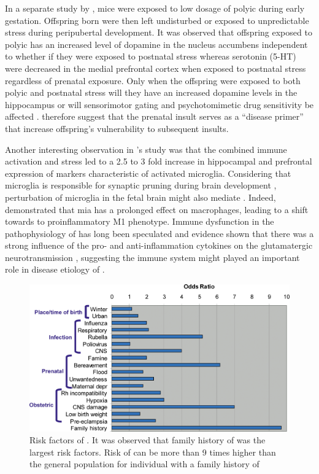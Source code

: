 	In a separate study by \citet{Giovanoli2013}, mice were exposed to low dosage of \gls{polyic} during early gestation.
	Offspring born were then left undisturbed or exposed to unpredictable stress during peripubertal development.
	It was observed that offspring exposed to \gls{polyic} has an increased level of dopamine in the nucleus accumbens independent to whether if they were exposed to postnatal stress whereas serotonin (5-HT) were decreased in the medial prefrontal cortex when exposed to postnatal stress regardless of prenatal exposure.
	Only when the offspring were exposed to both \gls{polyic} and postnatal stress will they have an increased dopamine levels in the hippocampus or will sensorimotor gating and psychotomimetic drug sensitivity be affected \citep{Giovanoli2013}.
	\citet{Giovanoli2013} therefore suggest that the prenatal insult serves as a ``disease primer'' that increase offspring's vulnerability to subsequent insults.
	
	Another interesting observation in \citet{Giovanoli2013}'s study was that the combined immune activation and stress led to a 2.5 to 3 fold increase in hippocampal and prefrontal expression of markers characteristic of activated microglia.
	Considering that microglia is responsible for synaptic pruning during brain development \citep{Paolicelli2011}, perturbation of microglia in the fetal brain might also mediate .
	Indeed, \citet{Onore2014} demonstrated that \gls{mia} has a prolonged effect on macrophages, leading to a shift towards to proinflammatory M1 phenotype.
	Immune dysfunction in the pathophysiology of  has long been speculated \citep{Muller2010a} and evidence shown that there was a strong influence of the pro- and anti-inflammation cytokines on the glutamatergic neurotransmission \citep{Muller2010a}, suggesting the immune system might played an important role in disease etiology of .
	
	\begin{figure}
		\centering
		\includegraphics[width=\textwidth]{figure/risk_factors_of_schizophrenia.png}
		\caption[Risk factors of ]{Risk factors of .
			It was observed that family history of  was the largest risk factors.
			Risk of  can be more than 9 times higher than the general population for individual with a family history of }
		\label{fig:riskfactors}
	\end{figure}
	
